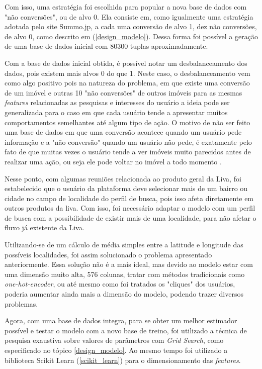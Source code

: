 Com isso, uma estratégia foi escolhida para popular a nova base de dados com "não conversões", ou de alvo 0. Ela consiste em, como igualmente uma estratégia adotada pelo site Summo.jp, a cada uma conversão de alvo 1, dez não conversões, de alvo 0, como descrito em (\ref{design_modelo}). Dessa forma foi possível a geração de uma base de dados inicial com 80300 tuplas aproximadamente.

Com a base de dados inicial obtida, é possível notar um desbalanceamento dos dados, pois existem mais alvos 0 do que 1. Neste caso, o desbalanceamento vem como algo positivo pois na natureza do problema, em que existe uma conversão de um imóvel e outras 10 "não conversões" de outros imóveis para as mesmas \textit{features} relacionadas as pesquisas e interesses do usuário a ideia pode ser generalizada para o caso em que cada usuário tende a apresentar muitos comportamentos semelhantes até algum tipo de ação. O motivo de não ser feito uma base de dados em que uma conversão acontece quando um usuário pede informação e a "não conversão" quando um usuário não pede, é exatamente pelo fato de que muitas vezes o usuário tende a ver imóveis muito parecidos antes de realizar uma ação, ou seja ele pode voltar no imóvel a todo momento \cite{Summo:2017}.

Nesse ponto, com algumas reuniões relacionada ao produto geral da Liva, foi estabelecido que o usuário da plataforma deve selecionar mais de um bairro ou cidade no campo de localidade do perfil de busca, pois isso afeta diretamente em outros produtos da liva. Com isso, foi necessário adaptar o modelo com um perfil de busca com a possibilidade de existir mais de uma localidade, para não afetar o fluxo já existente da Liva.

Utilizando-se de um cálculo de média simples entre a latitude e longitude das possíveis localidades, foi assim solucionado o problema apresentado anteriormente. Essa solução não é a mais ideal, mas devido ao modelo estar com uma dimensão muito alta, 576 colunas, tratar com métodos tradicionais como \textit{one-hot-encoder}, ou até mesmo como foi tratados os "cliques" dos usuários, poderia aumentar ainda mais a dimensão do modelo, podendo trazer diversos problemas.

Agora, com uma base de dados integra, para se obter um melhor estimador possível e testar o modelo com a novo base de treino, foi utilizado a técnica de pesquisa exaustiva sobre valores de parâmetros com \textit{Grid Search}, como especificado no tópico \ref{design_modelo}. Ao mesmo tempo foi utilizado a biblioteca Scikit Learn (\ref{scikit_learn}) para o dimensionamento das \textit{features}.

